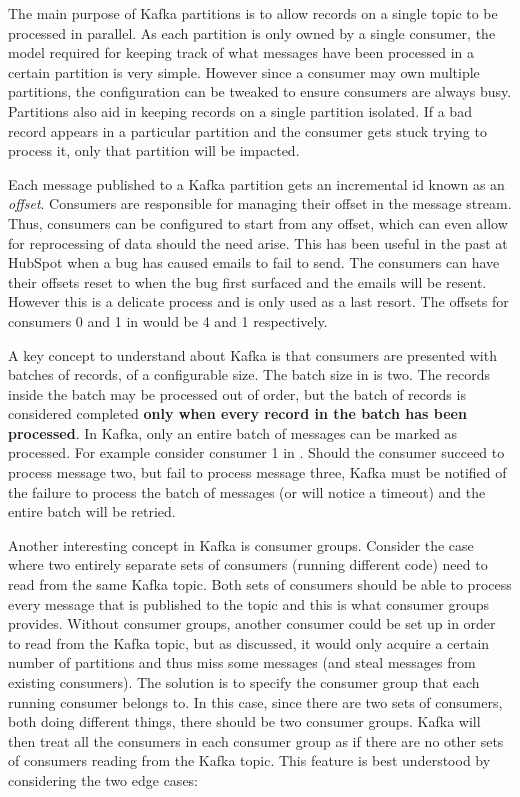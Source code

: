 The main purpose of Kafka partitions is to allow records on a single topic to be processed in parallel. As each partition is only owned by a single consumer, the model required for keeping track of what messages have been processed in a certain partition is very simple. However since a consumer may own multiple partitions, the configuration can be tweaked to ensure consumers are always busy. Partitions also aid in keeping records on a single partition isolated. If a bad record appears in a particular partition and the consumer gets stuck trying to process it, only that partition will be impacted.

Each message published to a Kafka partition gets an incremental id known as an \textit{offset}. Consumers are responsible for managing their offset in the message stream. Thus, consumers can be configured to start from any offset, which can even allow for reprocessing of data should the need arise. This has been useful in the past at HubSpot when a bug has caused emails to fail to send. The consumers can have their offsets reset to when the bug first surfaced and the emails will be resent. However this is a delicate process and is only used as a last resort. The offsets for consumers 0 and 1 in  would be 4 and 1 respectively.

A key concept to understand about Kafka is that consumers are presented with batches of records, of a configurable size. The batch size in  is two. The records inside the batch may be processed out of order, but the batch of records is considered completed \textbf{only when every record in the batch has been processed}. In Kafka, only an entire batch of messages can be marked as processed. For example consider consumer 1 in . Should the consumer succeed to process message two, but fail to process message three, Kafka must be notified of the failure to process the batch of messages (or will notice a timeout) and the entire batch will be retried.


Another interesting concept in Kafka is consumer groups. Consider the case where two entirely separate sets of consumers (running different code) need to read from the same Kafka topic. Both sets of consumers should be able to process every message that is published to the topic and this is what consumer groups provides. Without consumer groups, another consumer could be set up in order to read from the Kafka topic, but as discussed, it would only acquire a certain number of partitions and thus miss some messages (and steal messages from existing consumers). The solution is to specify the consumer group that each running consumer belongs to. In this case, since there are two sets of consumers, both doing different things, there should be two consumer groups. Kafka will then treat all the consumers in each consumer group as if there are no other sets of consumers reading from the Kafka topic. This feature is best understood by considering the two edge cases:


